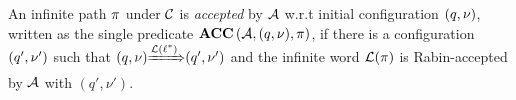 \begin{definition}\label{def:fnacc}
An infinite path $\pi$ under $\mathcal{C}$ is \emph{accepted} by $\mathcal{A}$ w.r.t
initial configuration $(q,\nu)$, written as the single predicate $\mbox{\bf ACC} \left( {\mathcal{A}}, {(q,\nu)}, {\pi} \right)$,
if there is a configuration $(q',\nu')$ such that ${(q,\nu)}{\xRightarrow{\mathcal{L}(\ell^*)}}{(q',\nu')}$ and
the infinite word $\mathcal{L}(\pi)$ is Rabin-accepted by $\mathcal{A}$ with
$
\left(q',\nu'\right)
$.
\end{definition}

